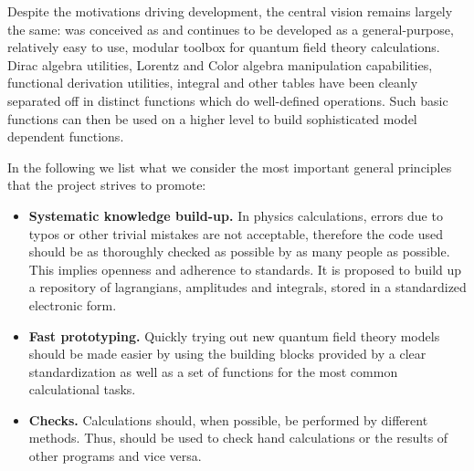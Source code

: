 Despite the motivations driving development, the central vision remains largely the same: 
\fc was conceived as and continues to be developed as a general-purpose, relatively easy to use,
modular toolbox for quantum field theory calculations. 
Dirac algebra utilities, Lorentz and Color algebra manipulation capabilities, 
functional derivation utilities, integral and other tables have been cleanly 
separated off in distinct functions which 
do well-defined operations.
Such basic functions can then be used  on a higher level to build sophisticated model dependent functions.

In the following we list what we consider the most important general principles that the \fc
project strives to promote:

\begin{itemize}

%

\item{{\bf Systematic knowledge build-up.} In physics calculations, errors due to typos or
other trivial mistakes are not acceptable, therefore the code used should be as thoroughly
checked as possible by as many people as possible. This implies openness and adherence to
standards. It is proposed to build up a repository of lagrangians, amplitudes and integrals,
stored in a standardized electronic form.}


\item{{\bf Fast prototyping.} Quickly trying out new quantum field theory models should be made
easier by using the building blocks provided by a clear standardization as well as a set of
functions for the most common calculational tasks.}

\item{{\bf Checks.} Calculations should, when possible, be performed by different methods.
Thus, \fc should be used to check hand calculations or the results of other programs and
vice versa.}

\end{itemize}

